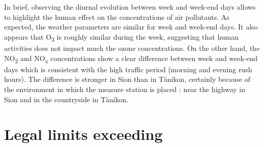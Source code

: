 \documentclass[a4paper, 12pt]{article}
\begin{document}
    \\
    \\
    In brief, observing the diurnal evolution between week and week-end days allows to highlight the human effect on the concentrations of air pollutants. As expected, the weather parameters are similar for week and week-end days. It also appears that O\textsubscript{3} is roughly similar during the week, suggesting that human activities does not impact much the ozone concentrations. On the other hand, the NO\textsubscript{2} and NO\textsubscript{x} concentrations show a clear difference between week and week-end days which is consistent with the high traffic period (morning and evening rush hours). The difference is stronger in Sion than in Tänikon, certainly because of the environment in which the measure station is placed : near the highway in Sion and in the countryside in Tänikon. 
    
\section{Legal limits exceeding}
        
\end{document}
